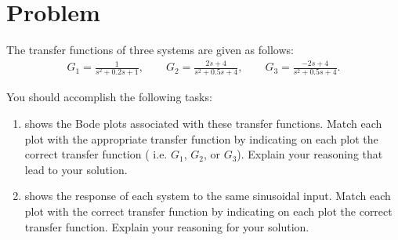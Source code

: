 \documentclass[11pt, reqno]{article}    %
\begin{document}
\section{Problem}

The transfer functions of three systems are given as follows:
\begin{align*}
    G_1 = \frac{1}{s^2 + 0.2 s+ 1}, \qquad G_2 = \frac{2s +4}{s^2 + 0.5 s + 4}, \qquad G_3 = \frac{-2s + 4}{s^2 + 0.5 s +4}.
\end{align*}

You should accomplish the following tasks:
\begin{enumerate}
    \item {} shows the Bode plots associated with these transfer functions.
        Match each plot with the appropriate transfer function by indicating on each plot the correct transfer function ( i.e. \(G_1\), \(G_2\), or \(G_3\)).
        Explain your reasoning that lead to your solution.
    \item {} shows the response of each system to the same sinusoidal input.
        Match each plot with the correct transfer function by indicating on each plot the correct transfer function. 
        Explain your reasoning for your solution.
\end{enumerate}
\end{document}
